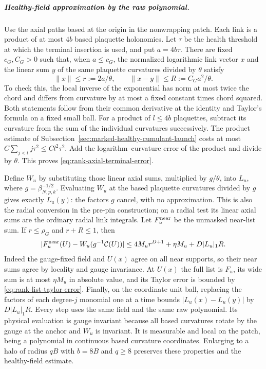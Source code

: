 \subparagraph{Healthy-field approximation by the raw polynomial.}
Use the axial paths based at the origin in the nonwrapping patch.
Each link is a product of at most $4b$ based plaquette holonomies.
Let $\tau$ be the health threshold at which the terminal insertion
is used, and put $a=4b\tau$. There are fixed $c_G,C_G>0$ such that,
when $a\le c_G$, the normalized logarithmic link vector $x$ and
the linear sum $y$ of the same plaquette curvatures divided by
$\theta$ satisfy
\begin{equation}\label{eq:rank-axial-terminal-error}
 \|x\|\le r:=2a/\theta,\qquad
 \|x-y\|\le R:=C_G a^2/\theta.
\end{equation}
To check this, the local inverse of the exponential has norm at
most twice the chord and differs from curvature by at most a fixed
constant times chord squared. Both statements follow from their
common derivative at the identity and Taylor's formula on a fixed
small ball. For a product of $l\le4b$ plaquettes, subtract its
curvature from the sum of the individual curvatures successively.
The product estimate of Subsection~\ref{sec:marked-healthy-cumulant-launch}
costs at most $C\sum_{j<l}j\tau^2\le C l^2\tau^2$.
Add the logarithm--curvature error of the product and divide by
$\theta$. This proves \eqref{eq:rank-axial-terminal-error}.

Define $W_u$ by substituting those linear axial sums, multiplied by
$g/\theta$, into $L_u$, where $g=\beta_{N,p,k}^{-1/2}$.
Evaluating $W_u$ at the based plaquette curvatures divided by $g$
gives exactly $L_u(y)$: the factors $g$ cancel, with no approximation.
This is also the radial conversion in the pre-pin construction;
on a radial test its linear axial sums are the ordinary radial
link integrals. Let $F_u^{\rm near}$ be the unmasked near-list sum.
If $r\le\rho_G$ and $r+R\le1$, then
\begin{equation}\label{eq:rank-raw-terminal-ticket}
 |F_u^{\rm near}(U)-W_u(g^{-1}\mathcal C(U))|
 \le4M_u r^{D+1}+\eta M_u+D|L_u|_1R.
\end{equation}
Indeed the gauge-fixed field and $U(x)$ agree on all near supports,
so their near sums agree by locality and gauge invariance. At $U(x)$
the full list is $F_u$, its wide sum is at most $\eta M_u$ in
absolute value, and its Taylor error is bounded by
\eqref{eq:rank-list-taylor-error}. Finally, on the coordinate unit
ball, replacing the factors of each degree-$j$ monomial one at a
time bounds $|L_u(x)-L_u(y)|$ by $D|L_u|_1R$.
Every step uses the same field and the same raw polynomial.
Its physical evaluation is gauge invariant because all based
curvatures rotate by the gauge at the anchor and $W_u$ is invariant.
It is measurable and local on the patch, being a polynomial in
continuous based curvature coordinates. Enlarging to a halo of radius
$qB$ with $b=8B$ and $q\ge8$ preserves these properties and the
healthy-field estimate.

